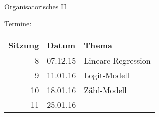 \documentclass[ignorenonframetext,]{beamer}
\begin{document}
\begin{frame}{Organisatorisches II}

Termine:

\begin{longtable}[c]{@{}rll@{}}
\toprule
\begin{minipage}[b]{0.17\columnwidth}\raggedleft\strut
Sitzung
\strut\end{minipage} &
\begin{minipage}[b]{0.17\columnwidth}\raggedright\strut
Datum
\strut\end{minipage} &
\begin{minipage}[b]{0.58\columnwidth}\raggedright\strut
Thema
\strut\end{minipage}\tabularnewline
\midrule
\endhead
\begin{minipage}[t]{0.17\columnwidth}\raggedleft\strut
8
\strut\end{minipage} &
\begin{minipage}[t]{0.17\columnwidth}\raggedright\strut
07.12.15
\strut\end{minipage} &
\begin{minipage}[t]{0.58\columnwidth}\raggedright\strut
Lineare Regression
\strut\end{minipage}\tabularnewline
\begin{minipage}[t]{0.17\columnwidth}\raggedleft\strut
9
\strut\end{minipage} &
\begin{minipage}[t]{0.17\columnwidth}\raggedright\strut
11.01.16
\strut\end{minipage} &
\begin{minipage}[t]{0.58\columnwidth}\raggedright\strut
Logit-Modell
\strut\end{minipage}\tabularnewline
\begin{minipage}[t]{0.17\columnwidth}\raggedleft\strut
10
\strut\end{minipage} &
\begin{minipage}[t]{0.17\columnwidth}\raggedright\strut
18.01.16
\strut\end{minipage} &
\begin{minipage}[t]{0.58\columnwidth}\raggedright\strut
Zähl-Modell
\strut\end{minipage}\tabularnewline
\begin{minipage}[t]{0.17\columnwidth}\raggedleft\strut
11
\strut\end{minipage} &
\begin{minipage}[t]{0.17\columnwidth}\raggedright\strut
25.01.16
\strut\end{minipage} &

\end{longtable}
\end{frame}
\end{document}
